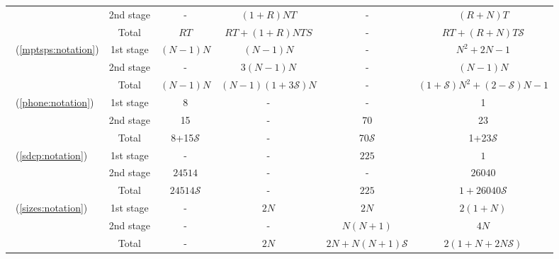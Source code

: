 \begin{table}[H]
{\begin{threeparttable}
\begin{tabular}{@{}lccccc@{}}
				& 2nd stage & -             & $(1+R)NT$               & -                    & $(R+N)T$                  \\ \cmidrule(l){2-6} 
				& Total          & $RT$           & $RT+(1+R)NTS$ & -                    & $RT+(R+N)T\mathcal{S}$    \\ \midrule
				\multirow{3}{*}{\mptsps\ (\ref{mptsps:notation})} & 1st stage & $(N-1)N$          & $(N-1)N$                              & -                    & $N^2+2N-1$                \\
				& 2nd stage & -              & $3(N-1)N$                            & -                    & $(N-1)N$                     \\ \cmidrule(l){2-6} 
				& Total          & $(N-1)N$          & $(N-1)(1+3\mathcal{S})N$              & -                    & $(1+\mathcal{S})N^2+(2-\mathcal{S})N-1$ \\ \midrule
				\multirow{3}{*}{\phone\ (\ref{phone:notation})}   & 1st stage & 8           &  -                              &  -                   &  1                     \\
				& 2nd stage &    15          &      -          &      70               &    23               \\ \cmidrule(l){2-6} 
				& Total          &    8+15$\mathcal{S}$        & - &    70$\mathcal{S}$                &  1+23$\mathcal{S}$ \\ \midrule
				\multirow{3}{*}{\sdcp\ (\ref{sdcp:notation})}  & 1st stage & -              & -                               & $225$                  & $1$                  \\
				& 2nd stage & $24514$              & -                                  & -             & $26040$                     \\ \cmidrule(l){2-6} 
				& Total          & $24514\mathcal{S}$              & -                               & $225$ & $1+26040\mathcal{S}$    \\ \midrule
				\multirow{3}{*}{\sizes\ (\ref{sizes:notation})}  & 1st stage & -              & $2N$                               & $2N$                 & $2(1+N)$                  \\
				& 2nd stage & -              & -                                  & $N(N+1)$              & $4N$                     \\ \cmidrule(l){2-6} 
				& Total          & -              & $2N$                               & $2N+N(N+1)\mathcal{S}$ & $2(1+N+2N\mathcal{S})$    \\ \midrule

\end{tabular}
\end{threeparttable}}
\end{table}
